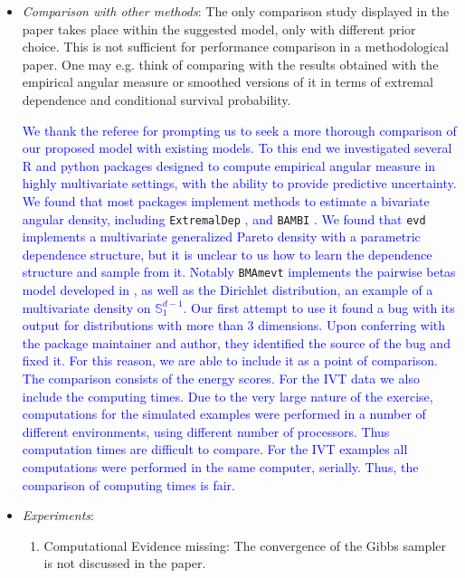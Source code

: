 \documentclass[10pt]{article}
\newcommand{\response}[1]{\textcolor{blue}{#1}}
\begin{document}
\begin{itemize}
\item \emph{Comparison with other methods}: The only comparison study displayed in the paper 
    takes place within the suggested model, only with different prior choice. This is not sufficient 
    for performance comparison in a methodological paper. One may e.g. think of comparing with the
    results obtained with the empirical angular measure or smoothed versions of it in terms of 
    extremal dependence and conditional survival probability.

\response{We thank the referee for prompting us to seek a more thorough comparison of our proposed
        model with existing models. To this end we investigated several R and python packages designed 
        to compute empirical angular measure in highly multivariate settings, with the ability to 
        provide predictive uncertainty. We found that most packages implement methods to estimate
        a bivariate angular density,}  \response{including} \verb|ExtremalDep| \response{\citep{ExtremalDep},}
        \response{and} \verb|BAMBI| \response{\citep{BAMBI}. We found that} \verb|evd| \response{\citep{evd} implements a multivariate 
        generalized Pareto density with a  parametric dependence structure, but it is unclear to us 
        how to learn the dependence structure and sample from it. 
        Notably} \verb|BMAmevt| \response{\citep{BMAmevt} implements the 
        pairwise betas model developed in \cite{sabourin2013}, as well as the Dirichlet distribution,
        an example of a multivariate density on $\mathbb{S}_1^{d-1}$.  Our first attempt to use
        it found a bug with its output for distributions with more than 3 dimensions.  Upon 
        conferring with the package maintainer and author, they identified the source of the
        bug and fixed it.  For this reason, we are able to include it as a point of comparison. The
        comparison consists of the energy scores. For the IVT data we also include the computing
        times. Due to the very large nature of the exercise, computations for the simulated examples 
        were performed in a number of different environments, using different number of processors. Thus
        computation times are difficult to compare. For the IVT examples all computations were performed 
        in the same computer, serially. Thus, the comparison of computing times is fair. 
}    

    \item \emph{Experiments}:
        \begin{enumerate}
            \item Computational Evidence missing: The convergence of the Gibbs sampler is not 
            discussed in the paper.


\end{enumerate}
\end{itemize}
\end{document}
